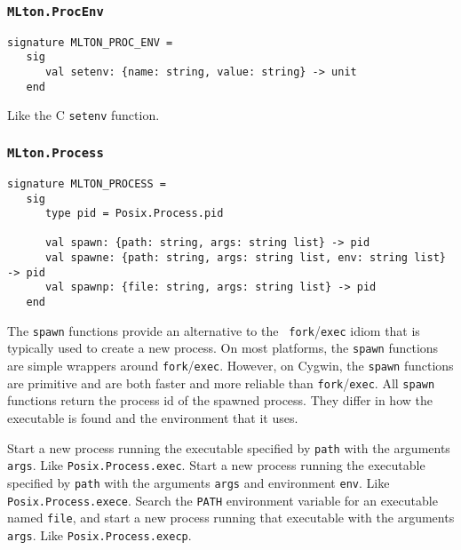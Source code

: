 \subsubsection{\tt MLton.ProcEnv}

\begin{verbatim}
signature MLTON_PROC_ENV =
   sig
      val setenv: {name: string, value: string} -> unit
   end
\end{verbatim}

\begin{description}
Like the C {\tt setenv} function.
\end{description}
%
\subsubsection{\tt MLton.Process}

\begin{verbatim}
signature MLTON_PROCESS =
   sig
      type pid = Posix.Process.pid

      val spawn: {path: string, args: string list} -> pid
      val spawne: {path: string, args: string list, env: string list} -> pid
      val spawnp: {file: string, args: string list} -> pid
   end
\end{verbatim}

The {\tt spawn} functions provide an alternative to the {\tt
fork}/{\tt exec} idiom that is typically used to create a new process.
On most platforms, the {\tt spawn} functions are simple wrappers
around {\tt fork}/{\tt exec}.  However, on Cygwin, the {\tt spawn}
functions are primitive and are both faster and more reliable than
{\tt fork}/{\tt exec}.  All {\tt spawn} functions return the process
id of the spawned process.  They differ in how the executable is found
and the environment that it uses.

\begin{description}
Start a new process running the executable specified by {\tt path} with the
arguments {\tt args}.  Like {\tt Posix.Process.exec}.
Start a new process running the executable specified by {\tt path} with the
arguments {\tt args} and environment {\tt env}.  Like {\tt Posix.Process.exece}.
Search the {\tt PATH} environment variable for an executable named {\tt file},
and start a new process running that executable with the arguments {\tt args}.
Like {\tt Posix.Process.execp}.
\end{description}

